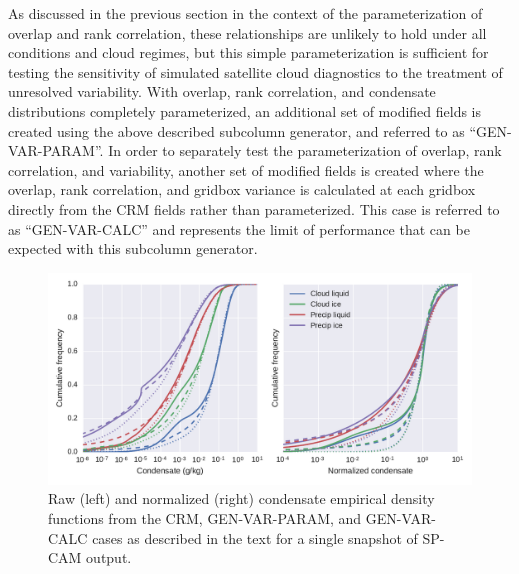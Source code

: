 As discussed in the previous section in the context of the parameterization of overlap and rank correlation, these relationships are unlikely to hold under all conditions and cloud regimes, but this simple parameterization is sufficient for testing the sensitivity of simulated satellite cloud diagnostics to the treatment of unresolved variability. With overlap, rank correlation, and condensate distributions completely parameterized, an additional set of modified fields is created using the above described subcolumn generator, and referred to as ``GEN-VAR-PARAM''. In order to separately test the parameterization of overlap, rank correlation, and variability, another set of modified fields is created where the overlap, rank correlation, and gridbox variance is calculated at each gridbox directly from the CRM fields rather than parameterized. This case is referred to as ``GEN-VAR-CALC'' and represents the limit of performance that can be expected with this subcolumn generator. 

\begin{figure}
    \centering
    \includegraphics[width=\columnwidth]{graphics/subgrid2_mxratio_cdf2.pdf}
    \caption{Raw (left) and normalized (right) condensate empirical density functions from the CRM, GEN-VAR-PARAM, and GEN-VAR-CALC cases as described in the text for a single snapshot of SP-CAM output.}
    \label{subgrid2_condensate_cdf2}
\end{figure}

